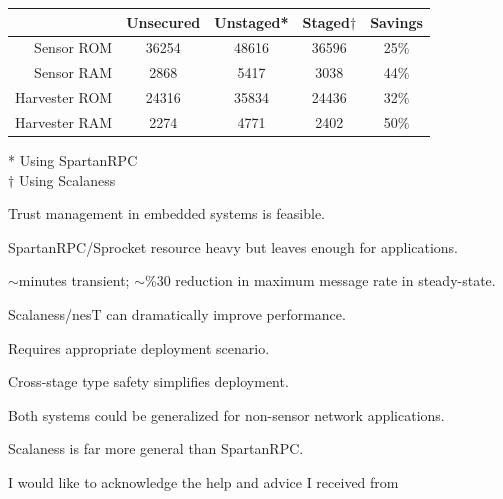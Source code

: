 
\begin{center}
\begin{tabular}{|r||c|c|c|c|} \hline
              & Unsecured & Unstaged* & Staged$\dagger$ & Savings\\ \hline
Sensor ROM    &     36254 &    48616 &  36596 & 25\% \\
Sensor RAM    &      2868 &     5417 &   3038 & 44\% \\ \hline
Harvester ROM &     24316 &    35834 &  24436 & 32\% \\
Harvester RAM &      2274 &     4771 &   2402 & 50\% \\ \hline
\end{tabular}
\end{center}
\vspace{0.5in}
* Using SpartanRPC\\
$\dagger$ Using Scalaness
\stopslide


\begin{citemize}
\item Trust management in embedded systems is feasible.
\item SpartanRPC/Sprocket resource heavy but leaves enough for applications.
\begin{citemize}
  \item $\sim$minutes transient; $\sim$\%30 reduction in maximum message rate in
    steady-state.
\end{citemize}
\item Scalaness/nesT can dramatically improve performance.
\begin{citemize}
  \item Requires appropriate deployment scenario.
  \item Cross-stage type safety simplifies deployment.
\end{citemize}
\item Both systems could be generalized for non-sensor network applications.
\item Scalaness is far more general than SpartanRPC.
\end{citemize}
\stopslide



\centerline{I would like to acknowledge the help and advice I received from}
\centerline{}
\stopslide


\makeatletter
{}
\makeatother
\stopslide
